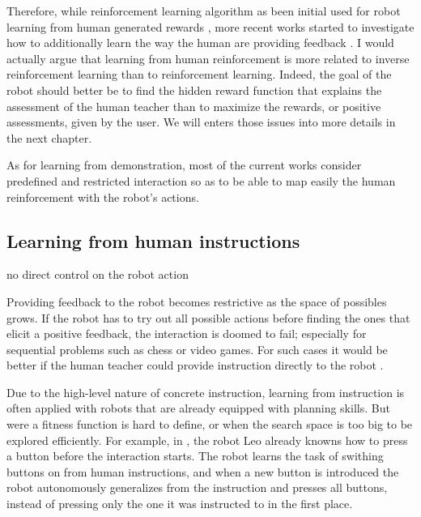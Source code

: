 Therefore, while reinforcement learning algorithm as been initial used for robot learning from human generated rewards \cite{thomaz2008teachable}, more recent works started to investigate how to additionally learn the way the human are providing feedback \cite{knox2009interactively}. I would actually argue that learning from human reinforcement is more related to inverse reinforcement learning than to reinforcement learning. Indeed, the goal of the robot should better be to find the hidden reward function that explains the assessment of the human teacher than to maximize the rewards, or positive assessments, given by the user. We will enters those issues into more details in the next chapter.

As for learning from demonstration, most of the current works consider predefined and restricted interaction so as to be able to map easily the human reinforcement with the robot's actions.




\subsection{Learning from human instructions}

no direct control on the robot action

Providing feedback to the robot becomes restrictive as the space of possibles grows. If the robot has to try out all possible actions before finding the ones that elicit a positive feedback, the interaction is doomed to fail; especially for sequential problems such as chess or video games. For such cases it would be better if the human teacher could provide instruction directly to the robot \cite{breazeal2004tutelage}.

Due to the high-level nature of concrete instruction, learning from instruction is often applied with robots that are already equipped with planning skills. But were a fitness function is hard to define, or when the search space is too big to be explored efficiently. For example, in \cite{lockerd2004tutelage}, the robot Leo already knowns how to press a button before the interaction starts. The robot learns the task of swithing buttons on from human instructions, and when a new button is introduced the robot autonomously generalizes from the instruction and presses all buttons, instead of pressing only the one it was instructed to in the first place. 

